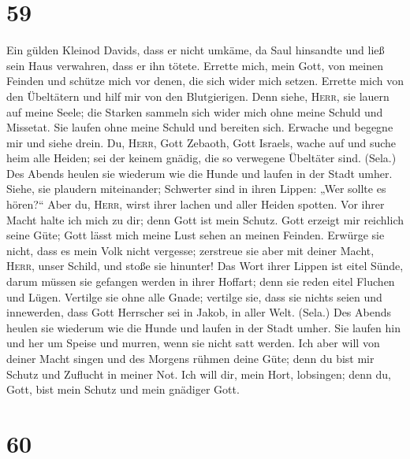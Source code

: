 \hypertarget{section-58}{%
\section{59}\label{section-58}}

 Ein gülden Kleinod Davids, dass er nicht umkäme, da Saul
hinsandte und ließ sein Haus verwahren, dass er ihn tötete.
 Errette mich, mein Gott, von meinen Feinden und schütze
mich vor denen, die sich wider mich setzen.  Errette mich
von den Übeltätern und hilf mir von den Blutgierigen. 
Denn siehe, \textsc{Herr}, sie lauern auf meine Seele; die Starken
sammeln sich wider mich ohne meine Schuld und Missetat. 
Sie laufen ohne meine Schuld und bereiten sich. Erwache und begegne mir
und siehe drein.  Du, \textsc{Herr}, Gott Zebaoth, Gott
Israels, wache auf und suche heim alle Heiden; sei der keinem gnädig,
die so verwegene Übeltäter sind. (Sela.)  Des Abends
heulen sie wiederum wie die Hunde und laufen in der Stadt umher.
 Siehe, sie plaudern miteinander; Schwerter sind in ihren
Lippen: „Wer sollte es hören?{}``  Aber du, \textsc{Herr},
wirst ihrer lachen und aller Heiden spotten.  Vor ihrer
Macht halte ich mich zu dir; denn Gott ist mein Schutz. 
Gott erzeigt mir reichlich seine Güte; Gott lässt mich meine Lust sehen
an meinen Feinden.  Erwürge sie nicht, dass es mein Volk
nicht vergesse; zerstreue sie aber mit deiner Macht, \textsc{Herr},
unser Schild, und stoße sie hinunter!  Das Wort ihrer
Lippen ist eitel Sünde, darum müssen sie gefangen werden in ihrer
Hoffart; denn sie reden eitel Fluchen und Lügen. 
Vertilge sie ohne alle Gnade; vertilge sie, dass sie nichts seien und
innewerden, dass Gott Herrscher sei in Jakob, in aller Welt. (Sela.)
 Des Abends heulen sie wiederum wie die Hunde und laufen
in der Stadt umher.  Sie laufen hin und her um Speise und
murren, wenn sie nicht satt werden.  Ich aber will von
deiner Macht singen und des Morgens rühmen deine Güte; denn du bist mir
Schutz und Zuflucht in meiner Not.  Ich will dir, mein
Hort, lobsingen; denn du, Gott, bist mein Schutz und mein gnädiger Gott.

\hypertarget{section-59}{%
\section{60}\label{section-59}}

